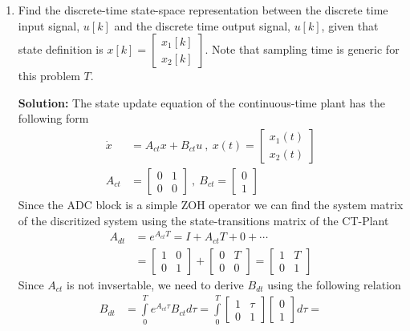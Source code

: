 \documentclass[twoside]{article}
\begin{document}
\begin{enumerate}
	\item Find the discrete-time state-space representation between the discrete time input signal, $u[k]$
	and the discrete time output signal, $u[k]$, given that state definition is $x[k] = \begin{bmatrix} x_1[k]  \\ x_2[k] \end{bmatrix}$. Note that
	sampling time is generic for this problem $T$.
	
\vspace{6pt}

\textbf{Solution:} The state update equation of the continuous-time plant has the following form
%
\begin{align*}
 \dot{x} &= A_{ct} x + B_{ct} u \ , \  x(t) = \begin{bmatrix} x_1(t)  \\ x_2(t) \end{bmatrix}
 \\
 A_{ct} &= \begin{bmatrix} 0 & 1 \\ 0 & 0 \end{bmatrix} \ , \ B_{ct} = \begin{bmatrix} 0 \\ 1 \end{bmatrix}
\end{align*}
%
Since the ADC block is a simple ZOH operator we can find the system matrix of the discritized system 
using the state-transitions matrix of the CT-Plant
%
\begin{align*}
 A_{dt} &= e^{A_{ct} T} = I + A_{ct} T + 0 + \cdots
 \\
 &= \begin{bmatrix} 1 & 0 \\ 0 & 1 \end{bmatrix} + \begin{bmatrix} 0 & T \\ 0 & 0 \end{bmatrix} =  \begin{bmatrix} 1 & T \\ 0 & 1 \end{bmatrix}
\end{align*}
%
Since $A_{ct}$ is not invsertable, we need to derive $B_{dt}$ using the following relation
%
%
\begin{align*}
 B_{dt} &= \int\limits_{0}^{T} e^{A_{ct} \tau} B_{ct} d\tau = 
 \int\limits_{0}^{T}  \begin{bmatrix} 1 & \tau \\ 0 & 1 \end{bmatrix} \begin{bmatrix} 0 \\ 1 \end{bmatrix}  d\tau = 

\end{align*}
\end{enumerate}
\end{document}
